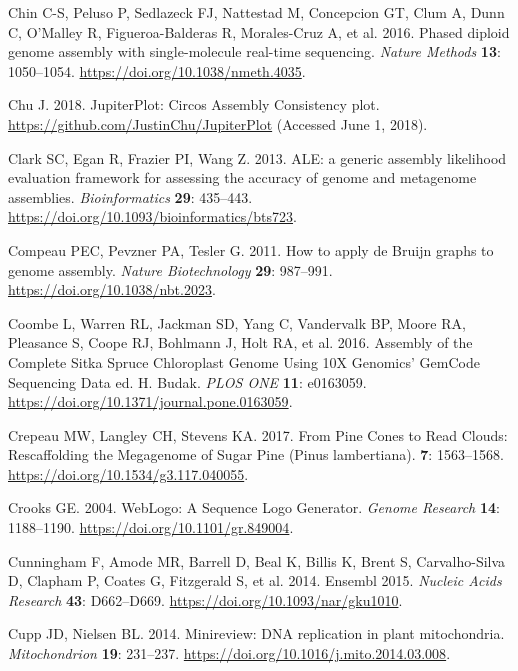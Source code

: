 \documentclass[
  12pt,
  oneside,
  openany]{book}
\begin{document}
\leavevmode\hypertarget{ref-Chin_2016}{}%
Chin C-S, Peluso P, Sedlazeck FJ, Nattestad M, Concepcion GT, Clum A, Dunn C, O'Malley R, Figueroa-Balderas R, Morales-Cruz A, et al. 2016. Phased diploid genome assembly with single-molecule real-time sequencing. \emph{Nature Methods} \textbf{13}: 1050--1054. \url{https://doi.org/10.1038/nmeth.4035}.

\leavevmode\hypertarget{ref-URL_JupiterPlot}{}%
Chu J. 2018. JupiterPlot: Circos Assembly Consistency plot. \url{https://github.com/JustinChu/JupiterPlot} (Accessed June 1, 2018).

\leavevmode\hypertarget{ref-Clark_2013}{}%
Clark SC, Egan R, Frazier PI, Wang Z. 2013. ALE: a generic assembly likelihood evaluation framework for assessing the accuracy of genome and metagenome assemblies. \emph{Bioinformatics} \textbf{29}: 435--443. \url{https://doi.org/10.1093/bioinformatics/bts723}.

\leavevmode\hypertarget{ref-Compeau_2011}{}%
Compeau PEC, Pevzner PA, Tesler G. 2011. How to apply de Bruijn graphs to genome assembly. \emph{Nature Biotechnology} \textbf{29}: 987--991. \url{https://doi.org/10.1038/nbt.2023}.

\leavevmode\hypertarget{ref-Coombe_2016}{}%
Coombe L, Warren RL, Jackman SD, Yang C, Vandervalk BP, Moore RA, Pleasance S, Coope RJ, Bohlmann J, Holt RA, et al. 2016. Assembly of the Complete Sitka Spruce Chloroplast Genome Using 10X Genomics' GemCode Sequencing Data ed. H. Budak. \emph{PLOS ONE} \textbf{11}: e0163059. \url{https://doi.org/10.1371/journal.pone.0163059}.

\leavevmode\hypertarget{ref-Crepeau_2017}{}%
Crepeau MW, Langley CH, Stevens KA. 2017. From Pine Cones to Read Clouds: Rescaffolding the Megagenome of Sugar Pine (Pinus lambertiana). \textbf{7}: 1563--1568. \url{https://doi.org/10.1534/g3.117.040055}.

\leavevmode\hypertarget{ref-Crooks_2004}{}%
Crooks GE. 2004. WebLogo: A Sequence Logo Generator. \emph{Genome Research} \textbf{14}: 1188--1190. \url{https://doi.org/10.1101/gr.849004}.

\leavevmode\hypertarget{ref-Cunningham_2014}{}%
Cunningham F, Amode MR, Barrell D, Beal K, Billis K, Brent S, Carvalho-Silva D, Clapham P, Coates G, Fitzgerald S, et al. 2014. Ensembl 2015. \emph{Nucleic Acids Research} \textbf{43}: D662--D669. \url{https://doi.org/10.1093/nar/gku1010}.

\leavevmode\hypertarget{ref-Cupp_2014}{}%
Cupp JD, Nielsen BL. 2014. Minireview: DNA replication in plant mitochondria. \emph{Mitochondrion} \textbf{19}: 231--237. \url{https://doi.org/10.1016/j.mito.2014.03.008}.
\end{document}
